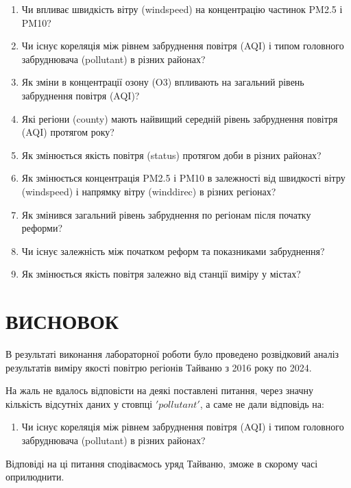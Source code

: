 \documentclass{article}
\begin{document}
\begin{enumerate}
  \item Чи впливає швидкість вітру (windspeed) на концентрацію частинок PM2.5 і PM10?
  \item  Чи існує кореляція між рівнем забруднення повітря (AQI) і типом головного забруднювача (pollutant) в різних районах?
  \item Як зміни в концентрації озону (O3) впливають на загальний рівень забруднення повітря (AQI)?
  \item Які регіони (county) мають найвищий середній рівень забруднення повітря (AQI) протягом року?
  \item Як змінюється якість повітря (status) протягом доби в різних районах?
  \item Як змінюється концентрація PM2.5 і PM10 в залежності від швидкості вітру (windspeed) і напрямку вітру (winddirec) в різних регіонах?
  \item Як змінився загальний рівень забруднення по регіонам після початку реформи?
  \item Чи існує залежність між початком реформ та показниками забруднення?
  \item Як змінюється якість повітря залежно від станції виміру у містах?
\end{enumerate}

\newpage



\pagebreak



\pagebreak

\newpage
\section{ВИСНОВОК}
В результаті виконання лабораторної роботи було проведено розвідковий аналіз результатів виміру якості повітрю регіонів Тайваню з 2016 року по 2024.

На жаль не вдалось відповісти на деякі поставлені питання, через значну кількість відсутніх даних у стовпці $'pollutant'$, а саме не дали відповідь на:
\begin{enumerate}

    \item  Чи існує кореляція між рівнем забруднення повітря (AQI) і типом головного забруднювача (pollutant) в різних районах?

\end{enumerate}
Відповіді на ці питання сподіваємось уряд Тайваню, зможе в скорому часі оприлюднити.
\end{document}
